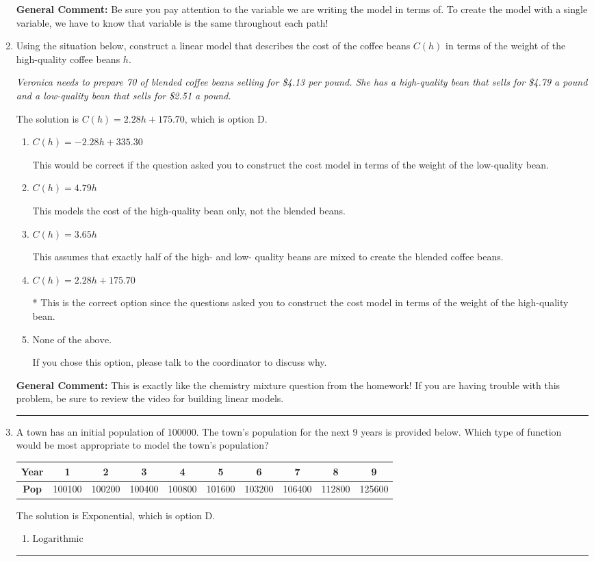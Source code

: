 \documentclass{extbook}[14pt]
\newcommand{\litem}[1]{\item #1

\rule{\textwidth}{0.4pt}}
\begin{document}
\begin{enumerate}
{\textbf{General Comment:} Be sure you pay attention to the variable we are writing the model in terms of. To create the model with a single variable, we have to know that variable is the same throughout each path!
}
\litem{
Using the situation below, construct a linear model that describes the cost of the coffee beans $C(h)$ in terms of the weight of the high-quality coffee beans $h$.

\begin{center}
    \textit{ Veronica needs to prepare 70 of blended coffee beans selling for \$4.13 per pound. She has a high-quality bean that sells for \$4.79 a pound and a low-quality bean that sells for \$2.51 a pound. }
\end{center}
The solution is \( C(h) = 2.28 h + 175.70 \), which is option D.\begin{enumerate}[label=\Alph*.]
\item \( C(h) = -2.28 h + 335.30 \)

This would be correct if the question asked you to construct the cost model in terms of the weight of the low-quality bean.
\item \( C(h) = 4.79 h \)

This models the cost of the high-quality bean only, not the blended beans.
\item \( C(h) = 3.65 h \)

This assumes that exactly half of the high- and low- quality beans are mixed to create the blended coffee beans.
\item \( C(h) = 2.28 h + 175.70 \)

* This is the correct option since the questions asked you to construct the cost model in terms of the weight of the high-quality bean.
\item \( \text{None of the above.} \)

If you chose this option, please talk to the coordinator to discuss why.
\end{enumerate}

\textbf{General Comment:} This is exactly like the chemistry mixture question from the homework! If you are having trouble with this problem, be sure to review the video for building linear models.
}
\litem{
A town has an initial population of 100000. The town's population for the next 9 years is provided below. Which type of function would be most appropriate to model the town's population?


\begin{tabular}{c|c|c|c|c|c|c|c|c|c}
\textbf{Year} &1 &2 &3 &4 &5 &6 &7 &8 &9\tabularnewline \hline
\textbf{Pop} &100100 &100200 &100400 &100800 &101600 &103200 &106400 &112800 &125600\end{tabular}The solution is \( \text{Exponential} \), which is option D.\begin{enumerate}[label=\Alph*.]
\item \( \text{Logarithmic} \)


\end{enumerate}}
\end{enumerate}
\end{document}

